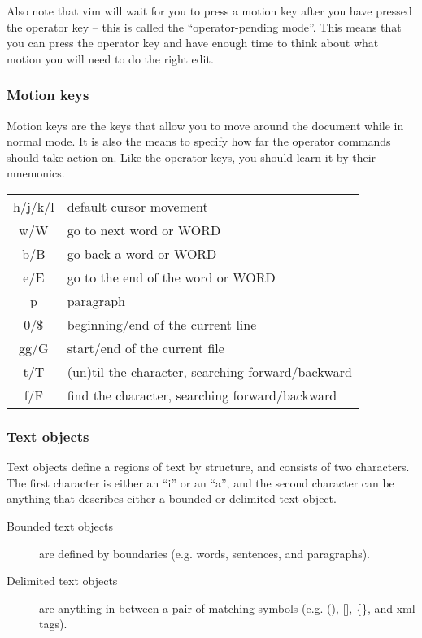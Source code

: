 Also note that vim will wait for you to press a motion key after you have pressed the operator key -- this is called the ``operator-pending mode''.
This means that you can press the operator key and have enough time to think about what motion you will need to do the right edit.

\subsubsection{Motion keys}

Motion keys are the keys that allow you to move around the document while in normal mode.
It is also the means to specify how far the operator commands should take action on.
Like the operator keys, you should learn it by their mnemonics.
\newline

\begin{tabular}[c]{c|l}
    h/j/k/l & default cursor movement\\
    w/W     & go to next word or WORD\\
    b/B     & go back a word or WORD\\
    e/E     & go to the end of the word or WORD\\
    p       & paragraph\\
    0/\$    & beginning/end of the current line\\
    gg/G    & start/end of the current file\\
    t/T     & (un)til the character, searching forward/backward\\
    f/F     & find the character, searching forward/backward\\
\end{tabular}

\subsubsection{Text objects}

Text objects define a regions of text by structure, and consists of two characters.
The first character is either an ``i'' or an ``a'', and the second character can be anything that describes either a bounded or delimited text object.

\begin{description}
    \item [Bounded text objects] are defined by boundaries (e.g. words, sentences, and paragraphs).
    \item [Delimited text objects] are anything in between a pair of matching symbols (e.g. (), [], \{\}, and xml tags).
\end{description}

